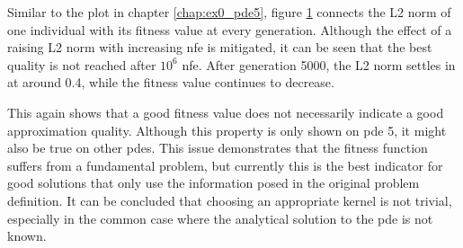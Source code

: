 \documentclass[./\jobname.tex]{subfiles}
\begin{document}
Similar to the plot in chapter \ref{chap:ex0_pde5}, figure \ref{fig:ex3_pde5_gsk_fit_vs_l2} connects the L2 norm of one individual with its fitness value at every generation. Although the effect of a raising L2 norm with increasing \gls{nfe} is mitigated, it can be seen that the best quality is not reached after $10^6$ \gls{nfe}. After generation 5000, the L2 norm settles in at around 0.4, while the fitness value continues to decrease. 

\begin{figure}[H]
	\centering
	\noindent{}
		\label{fig:ex3_pde5_gsk_fit_vs_l2}
\end{figure}
	
This again shows that a good fitness value does not necessarily indicate a good approximation quality. Although this property is only shown on \gls{pde} 5, it might also be true on other \gls{pde}s. This issue demonstrates that the fitness function suffers from a fundamental problem, but currently this is the best indicator for good solutions that only use the information posed in the original problem definition. It can be concluded that choosing an appropriate kernel is not trivial, especially in the common case where the analytical solution to the \gls{pde} is not known.  
\end{document}
